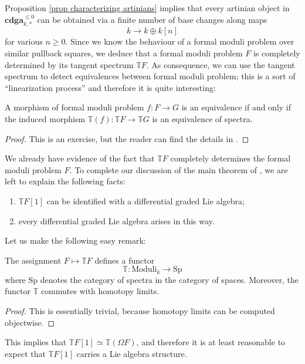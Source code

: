 \begin{refsection}
Proposition \ref{prop characterizing artinians} implies that every artinian object in $\mathbf{cdga}_{k,*}^{\le 0}$ can be obtained via a finite number of base changes along maps
\[
k \to k \oplus k[n]
\]
for various $n \ge 0$. Since we know the behaviour of a formal moduli problem over similar pullback squares, we deduce that a formal moduli problem $F$ is completely determined by its tangent spectrum $\mathbb T F$. As consequence, we can use the tangent spectrum to detect equivalences between formal moduli problem; this is a sort of ``linearization process'' and therefore it is quite interesting:

\begin{prop}
A morphism of formal moduli problem $f \colon F \to G$ is an equivalence if and only if the induced morphism $\mathbb T(f) \colon \mathbb T F \to \mathbb T G$ is an equivalence of spectra.
\end{prop}

\begin{proof}
This is an exercise, but the reader can find the details in \cite[Proposition 1.2.10]{dagx}.
\end{proof}

We already have evidence of the fact that $\mathbb T F$ completely determines the formal moduli problem $F$. To complete our discussion of the main theorem of \cite{dagx}, we are left to explain the following facts:
\begin{enumerate}
\item $\mathbb T F[1]$ can be identified with a differential graded Lie algebra;
\item every differential graded Lie algebra arises in this way.
\end{enumerate}

Let us make the following easy remark:

\begin{lemma}
The assignment $F \mapsto \mathbb T F$ defines a functor
\[
\mathbb T \colon \mathrm{Moduli}_k \to \mathrm{Sp}
\]
where $\mathrm{Sp}$ denotes the category of spectra in the category of spaces. Moreover, the functor $\mathbb T$ commutes with homotopy limits.
\end{lemma}

\begin{proof}
This is essentially trivial, because homotopy limits can be computed objectwise.
\end{proof}

This implies that $\mathbb T F[1] \simeq \mathbb T(\Omega F)$, and therefore it is at least reasonable to expect that $\mathbb T F[1]$ carries a Lie algebra structure.


\end{refsection}
